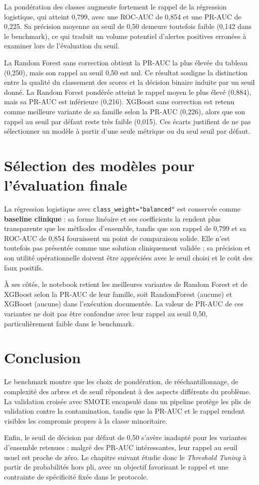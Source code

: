 La pondération des classes augmente fortement le rappel de la régression logistique, qui atteint 0,799, avec une ROC-AUC de 0,854 et une PR-AUC de 0,225. Sa précision moyenne au seuil de 0,50 demeure toutefois faible (0,142 dans le benchmark), ce qui traduit un volume potentiel d'alertes positives erronées à examiner lors de l'évaluation du seuil.

La Random Forest sans correction obtient la PR-AUC la plus élevée du tableau (0,250), mais son rappel au seuil 0,50 est nul. Ce résultat souligne la distinction entre la qualité du classement des scores et la décision binaire induite par un seuil donné. La Random Forest pondérée atteint le rappel moyen le plus élevé (0,884), mais sa PR-AUC est inférieure (0,216). XGBoost sans correction est retenu comme meilleure variante de sa famille selon la PR-AUC (0,226), alors que son rappel au seuil par défaut reste très faible (0,015). Ces écarts justifient de ne pas sélectionner un modèle à partir d'une seule métrique ou du seul seuil par défaut.

\section{Sélection des modèles pour l'évaluation finale}
La régression logistique avec \texttt{class\_weight="balanced"} est conservée comme \textbf{baseline clinique} : sa forme linéaire et ses coefficients la rendent plus transparente que les méthodes d'ensemble, tandis que son rappel de 0,799 et sa ROC-AUC de 0,854 fournissent un point de comparaison solide. Elle n'est toutefois pas présentée comme une solution cliniquement validée ; sa précision et son utilité opérationnelle doivent être appréciées avec le seuil choisi et le coût des faux positifs.

À ses côtés, le notebook retient les meilleures variantes de Random Forest et de XGBoost selon la PR-AUC de leur famille, soit RandomForest (aucune) et XGBoost (aucune) dans l'exécution documentée. La valeur de PR-AUC de ces variantes ne doit pas être confondue avec leur rappel au seuil 0,50, particulièrement faible dans le benchmark.

\section{Conclusion}
Le benchmark montre que les choix de pondération, de rééchantillonnage, de complexité des arbres et de seuil répondent à des aspects différents du problème. La validation croisée avec SMOTE encapsulé dans un pipeline protège les plis de validation contre la contamination, tandis que la PR-AUC et le rappel rendent visibles les compromis propres à la classe minoritaire.

Enfin, le seuil de décision par défaut de 0,50 s'avère inadapté pour les variantes d'ensemble retenues : malgré des PR-AUC intéressantes, leur rappel au seuil usuel est proche de zéro. Le chapitre suivant étudie donc le \textit{Threshold Tuning} à partir de probabilités hors pli, avec un objectif favorisant le rappel et une contrainte de spécificité fixée dans le protocole.
